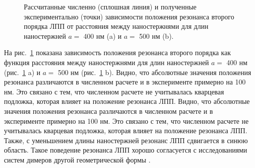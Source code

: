 \begin{figure}
\caption{Рассчитанные численно (сплошная линия) и полученные экспериментально (точки) зависимости положения резонанса второго порядка ЛПП от расстояния между наностержнями для длин наностержней $ a = $ 400 нм (a) и $ a = $ 500 нм (b).}
\label{img:2res}
\end{figure}
На рис.~\ref{img:2res} показана зависимость положения резонанса второго порядка как функция расстояния между наностержнями для длин наностержней $ a = $ 400 нм (рис.~\ref{img:2res} a) и $ a = $ 500 нм (рис.~\ref{img:2res} b). Видно, что абсолютные значения положения резонанса различаются в численном расчете и в эксперименте примерно на 100 нм. Это связано с тем, что численном расчете не учитывалась кварцевая подложка, которая влияет на положение резонанса ЛПП. Видно, что абсолютные значения положения резонанса различаются в численном расчете и в эксперименте примерно на 100 нм. Это связано с тем, что численном расчете не учитывалась кварцевая подложка, которая влияет на положение резонанса ЛПП. Также, с уменьшением длины наностержней резонанс ЛПП сдвигается в синюю область. Такое поведение резонанса ЛПП хорошо согласуется с исследованиями систем димеров другой геометрической формы \cite{plasonrulereq, nanoprism}.
